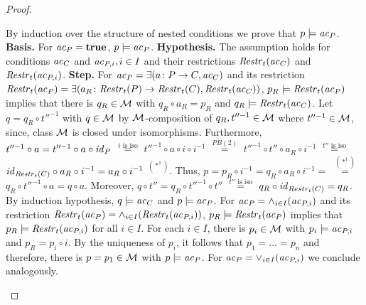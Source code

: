 \begin{proof}
\begin{enumerate}
  By induction over the structure of nested conditions we prove that $p \models \mathit{ac}_P$.
  \textbf{Basis.}
  For $\mathit{ac}_P=\textbf{true}$, $p \models \mathit{ac}_P$.
  \textbf{Hypothesis.}
  The assumption holds for conditions $\mathit{ac}_C$ and $\mathit{ac}_{P,i},i \in I$ and their restrictions $\mathit{Restr}_t(\mathit{ac}_C)$ and $\mathit{Restr}_t(\mathit{ac}_{P,i})$.
  \textbf{Step.}
  For $\mathit{ac}_P=\exists(a\colon P \to C, \mathit{ac}_C)$ and its restriction $\mathit{Restr}_t(\mathit{ac}_P)=\exists(a_R\colon \mathit{Restr}_t(P) \to \mathit{Restr}_t(C), \mathit{Restr}_t(\mathit{ac}_C))$, $p_R \models \mathit{Restr}_t(\mathit{ac}_P)$ implies that there is $q_R \in {\cal M}$ with $q_R \circ a_R=p_R$ and $q_R \models \mathit{Restr}_t(\mathit{ac}_C)$.
  Let $q=q_R \circ t''^{-1}$ with $q \in {\cal M}$ by ${\cal M}$-composition of $q_R,t''^{-1} \in {\cal M}$ where $t''^{-1} \in {\cal M}$, since, class ${\cal M}$ is closed under isomorphisms.
  Furthermore, $t''^{-1} \circ a=t''^{-1} \circ a \circ \mathit{id}_P$ $\stackrel{i\text{ is iso}}{=}$ $t''^{-1} \circ a \circ i \circ i^{-1}$ $\stackrel{PB (2)}{=}$ $t''^{-1} \circ t'' \circ a_R \circ i^{-1}$ $\stackrel{t''\text{ is iso}}{=}$ $\mathit{id}_{\mathit{Restr}_t(C)} \circ a_R \circ i^{-1}=a_R \circ i^{-1}$ $^{(*^1)}$.
  Thus, $p=p_R \circ i^{-1}=q_R \circ a_R \circ i^{-1}=$ $\stackrel{(*^1)}{=}$ $q_R \circ t''^{-1} \circ a=q \circ a$.
  Moreover, $q \circ t''=q_R \circ t''^{-1} \circ t''$ $\stackrel{t''\text{ is iso}}{=}$ $q_R \circ \mathit{id}_{Restr_t(C)}=q_R$.
  By induction hypothesis, $q \models \mathit{ac}_C$ and $p \models \mathit{ac}_P$.
  For $\mathit{ac}_P=\wedge_{i \in I}(\mathit{ac}_{P,i})$ and its restriction $\mathit{Restr}_t(\mathit{ac}_P)=\wedge_{i \in I}(\mathit{Restr}_t(\mathit{ac}_{P,i}))$, $p_R \models \mathit{Restr}_t(\mathit{ac}_P)$ implies that $p_R \models \mathit{Restr}_t(\mathit{ac}_{P,i})$ for all $i \in I$.
  For each $i \in I$, there is $p_i \in {\cal M}$ with $p_i \models \mathit{ac}_{P,i}$ and $p_R=p_i \circ i$.
  By the uniqueness of $p_i$, it follows that $p_1=\ldots=p_n$ and therefore, there is $p=p_1 \in {\cal M}$ with $p \models \mathit{ac}_P$.
  For $\mathit{ac}_P=\vee_{i \in I}(\mathit{ac}_{P,i})$ we conclude analogously.
\end{enumerate}
\vspace*{-.5cm}
\begin{center}
\end{center}
\end{proof}
